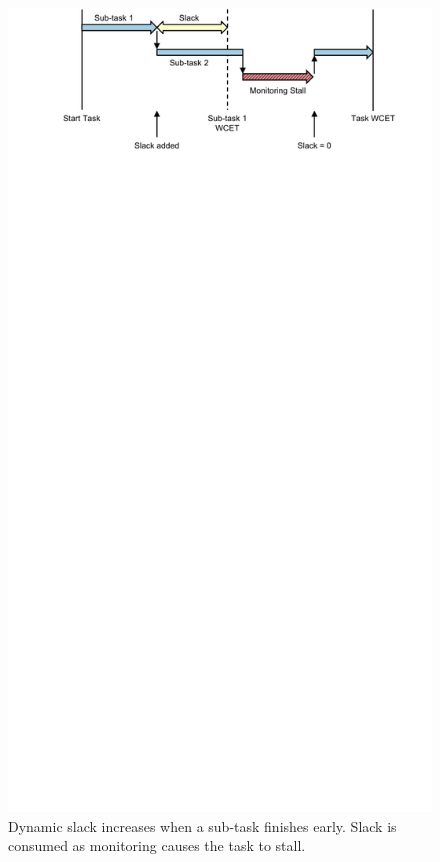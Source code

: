 \begin{figure}
  \begin{center}
    \includegraphics{monitoring_hard_drop/figs/task_slack.pdf}
    \caption{Dynamic slack increases when a sub-task finishes early. Slack is
    consumed as monitoring causes the task to stall.}
    \label{fig:monitoring_hard_drop.drop.task_slack} 
  \end{center}
\end{figure}

